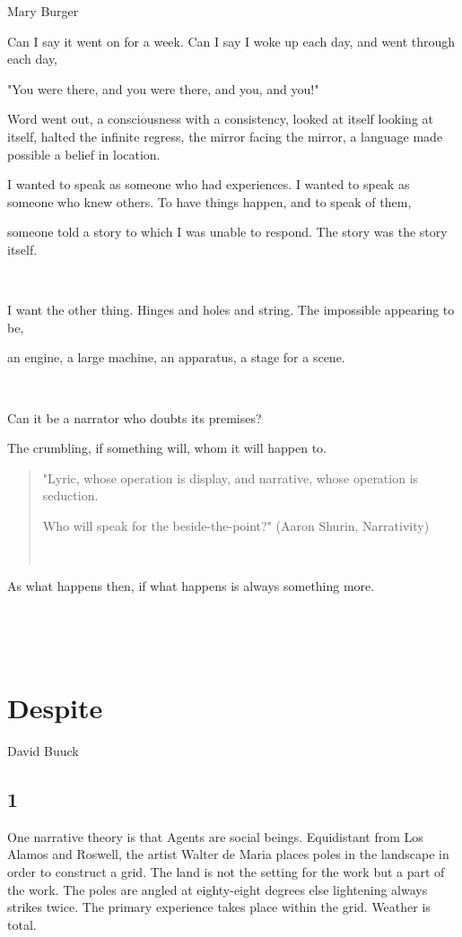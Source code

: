 Mary Burger

Can I say it went on for a week. Can I say I woke up each day, and went
through each day,

"You were there, and you were there, and you, and you!"

Word went out, a consciousness with a consistency, looked at itself
looking at itself, halted the infinite regress, the mirror facing the
mirror, a language made possible a belief in location.

I wanted to speak as someone who had experiences. I wanted to speak as
someone who knew others. To have things happen, and to speak of them,

someone told a story to which I was unable to respond. The story was the
story itself.

~

I want the other thing. Hinges and holes and string. The impossible
appearing to be,

an engine, a large machine, an apparatus, a stage for a scene.

~

Can it be a narrator who doubts its premises?

The crumbling, if something will, whom it will happen to.

\begin{quote}
"Lyric, whose operation is display, and narrative, whose operation is
seduction.

Who will speak for the beside-the-point?" (Aaron Shurin, Narrativity)

~
\end{quote}

As what happens then, if what happens is always something more.

~

~

\hypertarget{despite}{%
\section{Despite}\label{despite}}

David Buuck

\hypertarget{section-2}{%
\subsection{1}\label{section-2}}

One narrative theory is that Agents are social beings. Equidistant from
Los Alamos and Roswell, the artist Walter de Maria places poles in the
landscape in order to construct a grid. The land is not the setting for
the work but a part of the work. The poles are angled at eighty-eight
degrees else lightening always strikes twice. The primary experience
takes place within the grid. Weather is total.

